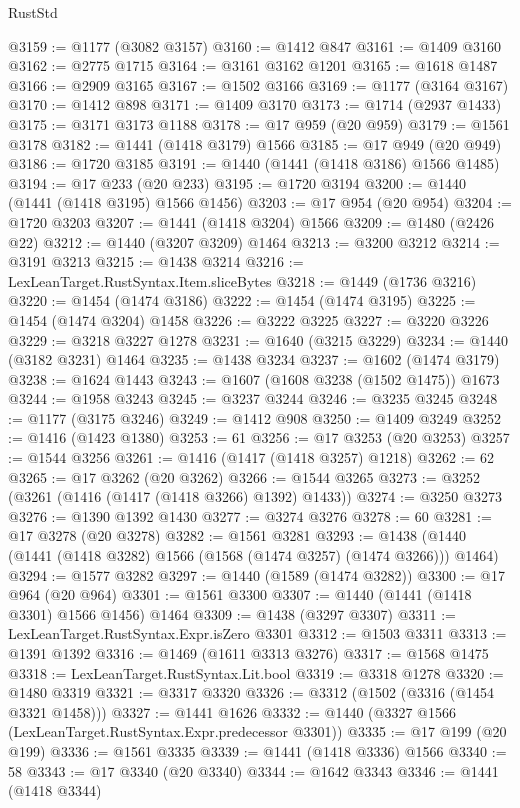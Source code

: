 \begin{lexlean}{RustStd}
\begin{coremodule}
@3159 := @1177 (@3082 @3157)
@3160 := @1412 @847
@3161 := @1409 @3160
@3162 := @2775 @1715
@3164 := @3161 @3162 @1201
@3165 := @1618 @1487
@3166 := @2909 @3165
@3167 := @1502 @3166
@3169 := @1177 (@3164 @3167)
@3170 := @1412 @898
@3171 := @1409 @3170
@3173 := @1714 (@2937 @1433)
@3175 := @3171 @3173 @1188
@3178 := @17 @959 (@20 @959)
@3179 := @1561 @3178
@3182 := @1441 (@1418 @3179) @1566
@3185 := @17 @949 (@20 @949)
@3186 := @1720 @3185
@3191 := @1440 (@1441 (@1418 @3186) @1566 @1485)
@3194 := @17 @233 (@20 @233)
@3195 := @1720 @3194
@3200 := @1440 (@1441 (@1418 @3195) @1566 @1456)
@3203 := @17 @954 (@20 @954)
@3204 := @1720 @3203
@3207 := @1441 (@1418 @3204) @1566
@3209 := @1480 (@2426 @22)
@3212 := @1440 (@3207 @3209) @1464
@3213 := @3200 @3212
@3214 := @3191 @3213
@3215 := @1438 @3214
@3216 := LexLeanTarget.RustSyntax.Item.sliceBytes
@3218 := @1449 (@1736 @3216)
@3220 := @1454 (@1474 @3186)
@3222 := @1454 (@1474 @3195)
@3225 := @1454 (@1474 @3204) @1458
@3226 := @3222 @3225
@3227 := @3220 @3226
@3229 := @3218 @3227 @1278
@3231 := @1640 (@3215 @3229)
@3234 := @1440 (@3182 @3231) @1464
@3235 := @1438 @3234
@3237 := @1602 (@1474 @3179)
@3238 := @1624 @1443
@3243 := @1607 (@1608 @3238 (@1502 @1475)) @1673
@3244 := @1958 @3243
@3245 := @3237 @3244
@3246 := @3235 @3245
@3248 := @1177 (@3175 @3246)
@3249 := @1412 @908
@3250 := @1409 @3249
@3252 := @1416 (@1423 @1380)
@3253 := 61
@3256 := @17 @3253 (@20 @3253)
@3257 := @1544 @3256
@3261 := @1416 (@1417 (@1418 @3257) @1218)
@3262 := 62
@3265 := @17 @3262 (@20 @3262)
@3266 := @1544 @3265
@3273 := @3252 (@3261 (@1416 (@1417 (@1418 @3266) @1392) @1433))
@3274 := @3250 @3273
@3276 := @1390 @1392 @1430
@3277 := @3274 @3276
@3278 := 60
@3281 := @17 @3278 (@20 @3278)
@3282 := @1561 @3281
@3293 := @1438 (@1440 (@1441 (@1418 @3282) @1566 (@1568 (@1474 @3257) (@1474 @3266))) @1464)
@3294 := @1577 @3282
@3297 := @1440 (@1589 (@1474 @3282))
@3300 := @17 @964 (@20 @964)
@3301 := @1561 @3300
@3307 := @1440 (@1441 (@1418 @3301) @1566 @1456) @1464
@3309 := @1438 (@3297 @3307)
@3311 := LexLeanTarget.RustSyntax.Expr.isZero @3301
@3312 := @1503 @3311
@3313 := @1391 @1392
@3316 := @1469 (@1611 @3313 @3276)
@3317 := @1568 @1475
@3318 := LexLeanTarget.RustSyntax.Lit.bool
@3319 := @3318 @1278
@3320 := @1480 @3319
@3321 := @3317 @3320
@3326 := @3312 (@1502 (@3316 (@1454 @3321 @1458)))
@3327 := @1441 @1626
@3332 := @1440 (@3327 @1566 (LexLeanTarget.RustSyntax.Expr.predecessor @3301))
@3335 := @17 @199 (@20 @199)
@3336 := @1561 @3335
@3339 := @1441 (@1418 @3336) @1566
@3340 := 58
@3343 := @17 @3340 (@20 @3340)
@3344 := @1642 @3343
@3346 := @1441 (@1418 @3344)

\end{coremodule}
\end{lexlean}
